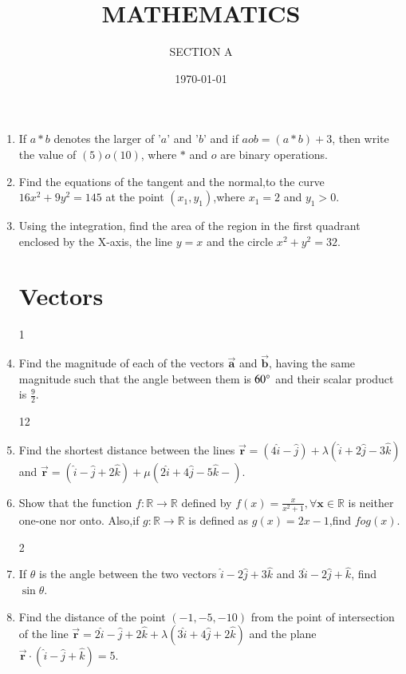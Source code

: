 \documentclass[10pt,-letter paper]{article}
\title{MATHEMATICS}
\author{SECTION A}
\date{\today}
\providecommand{\brak}[1]{\ensuremath{\left(#1\right)}}
\begin{document}
\maketitle

\begin{enumerate}
\section{Linear Forms}
  11 \item  If $a*b$ denotes the larger of '$a$' and '$b$' and if $a o b = \brak{a * b} + 3$, then write the value of $\brak{5} o \brak{10}$, where $*$ and $o$ are binary operations.
 \item Find the equations of the tangent and the normal,to the curve $16x^{2}+9y^{2}=145$ at the point $\brak{x_1,y_1}$,where $x_1=2$ and $y_1>0$.
 \item Using the integration, find the area of the region in the first quadrant enclosed by the X-axis, the line $y=x$ and the circle $x^{2}+y^{2}=32$.


 \section{Vectors}

1	\item Find the magnitude of each of the vectors $\overrightarrow{\mathbf{a}}$ and $\overrightarrow{\mathbf{b}}$, having the same magnitude such that the angle between them is ${60\degree}$ and their scalar product is $\frac{9}{2}$.
 
12  \item Find the shortest distance between the lines $\overrightarrow{\mathbf{r}}=\brak{4\hat{i}-\hat{j}}+\lambda\brak{\hat{i}+2\hat{j}-3\hat{k}}$ and $\overrightarrow{\mathbf{r}}=\brak{\hat{i}-\hat{j}+2\hat{k}}+\mu\brak{2\hat{i}+4\hat{j}-5\hat{k}-} $.

\item Show that the function $f:\mathbb{R}\rightarrow \mathbb{R}$ defined by $f\brak{x} = \frac{x}{x^{2}+1}, \forall \mathbf{x}\in \mathbb{R}$ is neither one-one nor onto. Also,if $g:\mathbb{R} \rightarrow \mathbb{R}$ is defined as $g\brak{x}=2x-1$,find $fog\brak{x}$.

2 \item If $\theta$ is the angle between the two vectors $\hat{i}-2\hat{j}+3\hat{k}$ and $3\hat{i}-2\hat{j}+\hat{k}$, find $\sin\theta$.

\item  Find the distance of the point \brak{-1,-5,-10} from the point of intersection of the line $\overrightarrow{\mathbf{r}}=2\hat{i}-\hat{j}+2\hat{k} + \lambda\brak{3\hat{i}+4\hat{j}+2\hat{k}}$ and the plane $\overrightarrow{\mathbf{r}}\cdot\brak{\hat{i}-\hat{j}+\hat{k}}=5$.


\end{enumerate}
\end{document}
